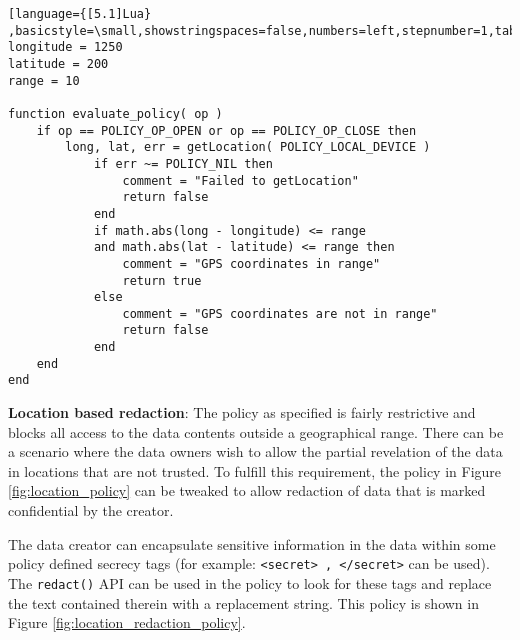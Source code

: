 \begin{figure*}[t]
\begin{lstlisting}[language={[5.1]Lua} ,basicstyle=\small,showstringspaces=false,numbers=left,stepnumber=1,tabsize=1]
longitude = 1250
latitude = 200
range = 10

function evaluate_policy( op )
    if op == POLICY_OP_OPEN or op == POLICY_OP_CLOSE then
        long, lat, err = getLocation( POLICY_LOCAL_DEVICE )
            if err ~= POLICY_NIL then
                comment = "Failed to getLocation"
                return false
            end
            if math.abs(long - longitude) <= range
            and math.abs(lat - latitude) <= range then
                comment = "GPS coordinates in range"
                return true
            else
                comment = "GPS coordinates are not in range"
                return false
            end
    end
end
\end{lstlisting}
\caption{Simple location based access policy}
\label{fig:location_policy}
\end{figure*}


\textbf{Location based redaction}: The policy as specified is fairly restrictive
and blocks all access to the data contents outside a geographical range. There
can be a scenario where the data owners wish to allow the partial revelation of
the data in locations that are not trusted. To fulfill this requirement, the
policy in Figure \ref{fig:location_policy} can be tweaked to allow redaction of
data that is marked confidential by the creator.

The data creator can encapsulate sensitive information in the data within some
policy defined secrecy tags (for example: \texttt{<secret> , </secret>} can be
used). The \texttt{redact()} API can be used in the policy to look for these
tags and replace the text contained therein with a replacement string. This
policy is shown in Figure \ref{fig:location_redaction_policy}.

